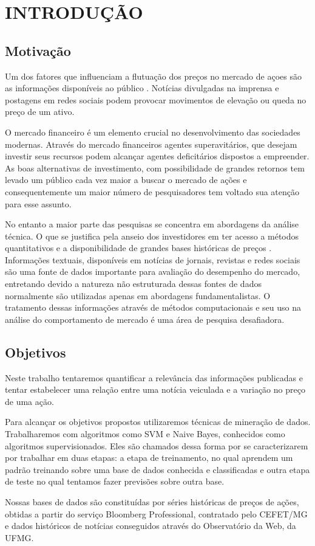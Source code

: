 \chapter{INTRODUÇÃO}

\section{Motivação}

    Um dos fatores que influenciam a flutuação dos preços no mercado de açoes são as informações disponíveis ao público \cite{ChanAndChui2001}. Notícias divulgadas na imprensa e postagens em redes sociais podem provocar movimentos de elevação ou queda no preço de um ativo. 

O mercado financeiro é um elemento crucial no desenvolvimento das sociedades modernas. Através do mercado financeiros agentes superavitários, que desejam investir seus recursos podem alcançar agentes deficitários dispostos a empreender. As boas alternativas de investimento, com possibilidade de grandes retornos tem levado um público cada vez maior a buscar o mercado de ações e consequentemente um maior número de pesquisadores tem voltado sua atenção para esse assunto.

No entanto a maior parte das pesquisas se concentra em abordagens da análise técnica. O que se justifica pela anseio dos investidores em ter acesso a métodos quantitativos e a disponibilidade de grandes bases históricas de preços \cite{Nassirtoussi2014}. Informações textuais, disponíveis em notícias de jornais, revistas e redes sociais são uma fonte de dados importante para avaliação do desempenho do mercado, entretando devido a natureza não estruturada dessas fontes de dados normalmente são utilizadas apenas em abordagens fundamentalistas. O tratamento dessas informações através de métodos computacionais e seu uso na análise do comportamento de mercado é uma área de pesquisa desafiadora. 


\section{Objetivos}

Neste trabalho tentaremos quantificar a relevância das informações publicadas e tentar estabelecer uma relação entre uma notícia veiculada e a variação no preço de uma ação.

Para alcançar os objetivos propostos utilizaremos técnicas de mineração de dados. Trabalharemos com algoritmos como SVM e Naive Bayes, conhecidos como algoritmos supervisionados. Eles são chamados dessa forma por se caracterizarem por trabalhar em duas etapas: a etapa de treinamento, no qual aprendem um padrão treinando sobre uma base de dados conhecida e classificadas e outra etapa de teste no qual tentamos fazer previsões sobre outra base.

Nossas bases de dados são constituídas por séries históricas de preços de ações, obtidas a partir do serviço Bloomberg Professional, contratado pelo CEFET/MG e dados históricos de notícias conseguidos através do Observatório da Web, da UFMG.
